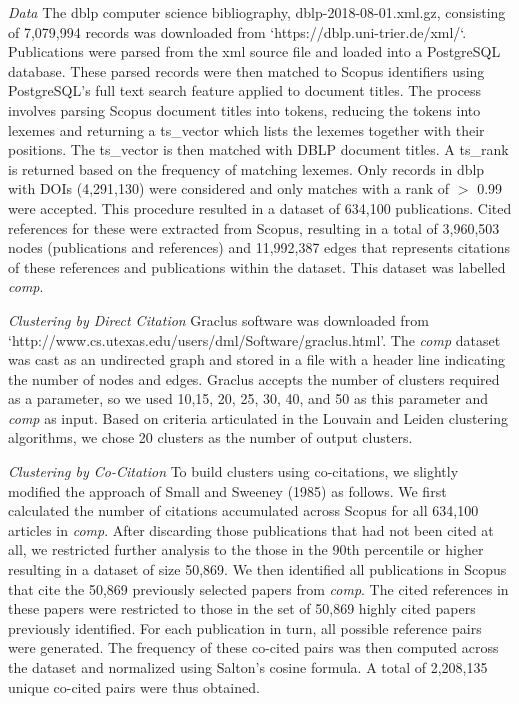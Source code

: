 \emph{Data} The dblp computer science bibliography, dblp-2018-08-01.xml.gz, consisting of 7,079,994 records was downloaded from  `https://dblp.uni-trier.de/xml/`. Publications were parsed from the xml source file and loaded into a PostgreSQL database. These parsed records were then matched to Scopus identifiers using PostgreSQL's full text search feature applied to document titles. The process involves parsing Scopus document titles into tokens, reducing the tokens into lexemes and returning a ts\_vector which lists the lexemes together with their positions. The ts\_vector is then matched with DBLP document titles. A ts\_rank is returned based on the frequency of matching lexemes. Only records in dblp with DOIs (4,291,130) were considered and only matches with a rank of $>$ 0.99 were accepted. This procedure resulted in a dataset of 634,100 publications. Cited references for these were extracted from Scopus, resulting in a total of 3,960,503 nodes (publications and references) and 11,992,387 edges that represents citations of these references and publications within the dataset. This dataset was labelled \emph{comp}.\par \emph{Clustering by Direct Citation} Graclus software was downloaded from \\`http://www.cs.utexas.edu/users/dml/Software/graclus.html'. The \emph{comp} dataset was cast as an undirected graph and stored in a file with a header line indicating the number of nodes and edges. Graclus accepts the number of clusters required as a parameter, so we used 10,15, 20, 25, 30, 40, and 50 as this parameter and  \emph{comp} as input. Based on criteria articulated in the Louvain and Leiden clustering algorithms, we chose 20 clusters as the number of output clusters. \par \emph{Clustering by Co-Citation} To build clusters using co-citations, we slightly modified the approach of Small and Sweeney (1985) as follows. We first calculated the number of citations accumulated across Scopus for all 634,100 articles in \emph{comp}. After discarding those publications that had not been cited at all, we restricted further analysis to the those in the 90th percentile or higher resulting in a dataset of size 50,869. We then identified all publications in Scopus that cite the 50,869 previously selected papers from \emph{comp}. The cited references in these papers were restricted to those in the set of 50,869 highly cited papers previously identified. For each publication in turn, all possible reference pairs were generated. The frequency of these co-cited pairs was then computed across the dataset  and normalized using Salton's cosine formula. A total of 2,208,135 unique co-cited pairs were thus obtained. 


